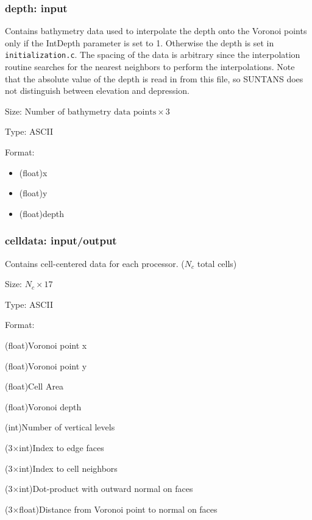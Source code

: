 \subsubsection{depth: input}

Contains bathymetry data used to interpolate the depth onto the Voronoi points only
if the IntDepth parameter is set to 1.  Otherwise the depth is set in \verb+initialization.c+.
The spacing of the data is arbitrary since the interpolation routine searches for the
nearest neighbors to perform the interpolations.  Note that the absolute value of the depth
is read in from this file, so SUNTANS does not distinguish between elevation and depression.
\begin{list}{}
\item Size: $\mbox{Number of bathymetry data points}\times 3$
\item Type: ASCII
\item Format: 
\begin{itemize}{}
\item (float)x
\item (float)y
\item (float)depth
\end{itemize}
\end{list}

\subsubsection{celldata: input/output}

Contains cell-centered data for each processor. ($N_c$ total cells)
\begin{list}{}
\item Size: $N_c\times 17$
\item Type: ASCII
\item Format:
\begin{list}{}
\item (float)Voronoi point x
\item (float)Voronoi point y
\item (float)Cell Area
\item (float)Voronoi depth
\item (int)Number of vertical levels
\item (3$\times$int)Index to edge faces
\item (3$\times$int)Index to cell neighbors
\item (3$\times$int)Dot-product with outward normal on faces
\item (3$\times$float)Distance from Voronoi point to normal on faces
\end{list}
\end{list}

